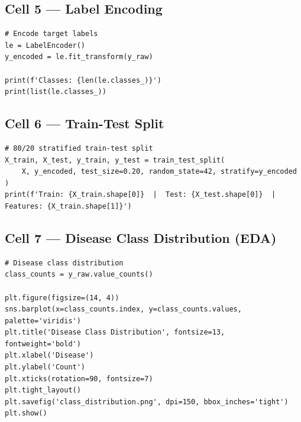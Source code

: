 \documentclass[12pt,a4paper]{article}
\begin{document}
\subsection{Cell 5 --- Label Encoding}

\begin{lstlisting}[caption=Cell 5: Label Encoding]
# Encode target labels
le = LabelEncoder()
y_encoded = le.fit_transform(y_raw)

print(f'Classes: {len(le.classes_)}')
print(list(le.classes_))
\end{lstlisting}

\subsection{Cell 6 --- Train-Test Split}

\begin{lstlisting}[caption=Cell 6: Stratified 80/20 Train-Test Split]
# 80/20 stratified train-test split
X_train, X_test, y_train, y_test = train_test_split(
    X, y_encoded, test_size=0.20, random_state=42, stratify=y_encoded
)
print(f'Train: {X_train.shape[0]}  |  Test: {X_test.shape[0]}  |  Features: {X_train.shape[1]}')
\end{lstlisting}

\subsection{Cell 7 --- Disease Class Distribution (EDA)}

\begin{lstlisting}[caption=Cell 7: Disease Class Distribution Plot]
# Disease class distribution
class_counts = y_raw.value_counts()

plt.figure(figsize=(14, 4))
sns.barplot(x=class_counts.index, y=class_counts.values, palette='viridis')
plt.title('Disease Class Distribution', fontsize=13, fontweight='bold')
plt.xlabel('Disease')
plt.ylabel('Count')
plt.xticks(rotation=90, fontsize=7)
plt.tight_layout()
plt.savefig('class_distribution.png', dpi=150, bbox_inches='tight')
plt.show()
\end{lstlisting}
\end{document}
